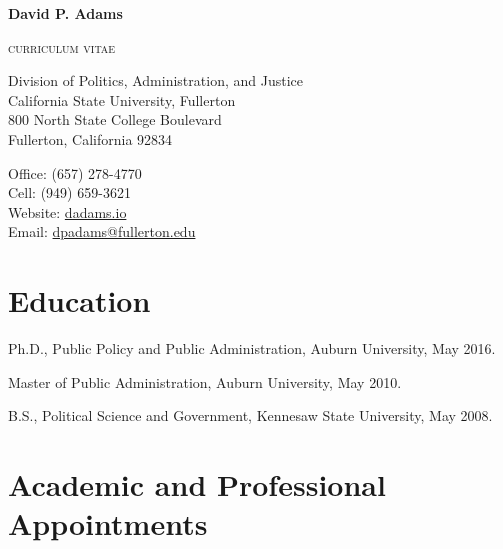\documentclass[12pt,letterpaper]{article}
\def\name{David P. Adams}
\renewenvironment{itemize}{
  \begin{list}{}{
    \setlength{\leftmargin}{1.5em}
    \setlength{\itemsep}{0.25em}
    \setlength{\parskip}{0pt}
    \setlength{\parsep}{0.25em}
  }
}{
  \end{list}
}
\begin{document}
    
    
\centerline{\huge \bf \name}
\smallskip
\centerline{\small{\textsc{curriculum vitae}}}

\bigskip

\noindent

\begin{minipage}[t]{0.55\textwidth}
    Division of Politics, Administration, and Justice \\
    California State University, Fullerton \\
    800 North State College Boulevard  \\
    Fullerton, California 92834
\end{minipage}
\hfill
\begin{minipage}[t]{0.4\textwidth}
    Office: \hspace{6em}(657) 278-4770 \\
    Cell: \hspace{6.5em} (949) 659-3621 \\
    Website: \hspace{7.0em}\href{https://dadams.io}{dadams.io} \\
    Email: \hspace{2.2em}\href{mailto:dpadams@fullerton.edu}{dpadams@fullerton.edu}
\end{minipage}


  \section*{Education}

  \begin{itemize}\leftmargin=2pt\itemindent=-15pt
  \item Ph.D., Public Policy and Public Administration, Auburn University, May 2016. \vspace{0.2cm}
  \item Master of Public Administration, Auburn University, May 2010. \vspace{0.2cm}
  \item B.S., Political Science and Government, Kennesaw State University, May 2008.
  \end{itemize}
  
  \section*{Academic and Professional Appointments}
\end{document}
